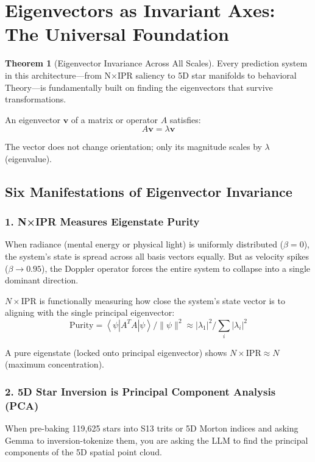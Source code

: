 \documentclass[11pt,oneside]{article}
\theoremstyle{definition}
\newtheorem{theorem}{Theorem}
\begin{document}
\section{Eigenvectors as Invariant Axes: The Universal Foundation}

\begin{theorem}[Eigenvector Invariance Across All Scales]
Every prediction system in this architecture—from N×IPR saliency to 5D star manifolds to behavioral Theory—is fundamentally built on finding the eigenvectors that survive transformations.

An eigenvector $\mathbf{v}$ of a matrix or operator $A$ satisfies:
\[
A \mathbf{v} = \lambda \mathbf{v}
\]

The vector does not change orientation; only its magnitude scales by $\lambda$ (eigenvalue).
\end{theorem}

\subsection{Six Manifestations of Eigenvector Invariance}

\subsubsection{1. N×IPR Measures Eigenstate Purity}

When radiance (mental energy or physical light) is uniformly distributed ($\beta = 0$), the system's state is spread across all basis vectors equally. But as velocity spikes ($\beta \to 0.95$), the Doppler operator forces the entire system to collapse into a single dominant direction.

$N \times \text{IPR}$ is functionally measuring how close the system's state vector is to aligning with the single principal eigenvector:
\[
\text{Purity} = \left\langle \psi \left| A^T A \right| \psi \right\rangle / \|\psi\|^2 \approx |\lambda_1|^2 / \sum_i |\lambda_i|^2
\]

A pure eigenstate (locked onto principal eigenvector) shows $N \times \text{IPR} \approx N$ (maximum concentration).

\subsubsection{2. 5D Star Inversion is Principal Component Analysis (PCA)}

When pre-baking 119,625 stars into S13 trits or 5D Morton indices and asking Gemma to inversion-tokenize them, you are asking the LLM to find the principal components of the 5D spatial point cloud.
\end{document}
